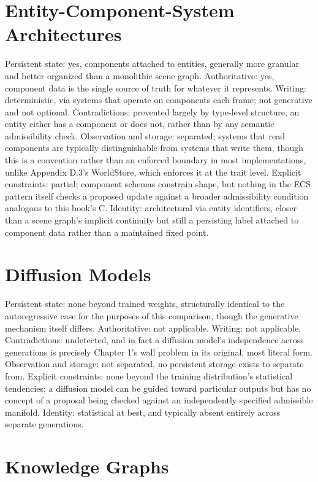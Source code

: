 \section{Entity-Component-System Architectures}

Persistent state: yes, components attached to entities, generally more granular and better organized than a monolithic scene graph. Authoritative: yes, component data is the single source of truth for whatever it represents. Writing: deterministic, via systems that operate on components each frame; not generative and not optional. Contradictions: prevented largely by type-level structure, an entity either has a component or does not, rather than by any semantic admissibility check. Observation and storage: separated; systems that read components are typically distinguishable from systems that write them, though this is a convention rather than an enforced boundary in most implementations, unlike Appendix D.3's WorldStore, which enforces it at the trait level. Explicit constraints: partial; component schemas constrain shape, but nothing in the ECS pattern itself checks a proposed update against a broader admissibility condition analogous to this book's C. Identity: architectural via entity identifiers, closer than a scene graph's implicit continuity but still a persisting label attached to component data rather than a maintained fixed point.

\section{Diffusion Models}

Persistent state: none beyond trained weights, structurally identical to the autoregressive case for the purposes of this comparison, though the generative mechanism itself differs. Authoritative: not applicable. Writing: not applicable. Contradictions: undetected, and in fact a diffusion model's independence across generations is precisely Chapter 1's wall problem in its original, most literal form. Observation and storage: not separated, no persistent storage exists to separate from. Explicit constraints: none beyond the training distribution's statistical tendencies; a diffusion model can be guided toward particular outputs but has no concept of a proposal being checked against an independently specified admissible manifold. Identity: statistical at best, and typically absent entirely across separate generations.

\section{Knowledge Graphs}

